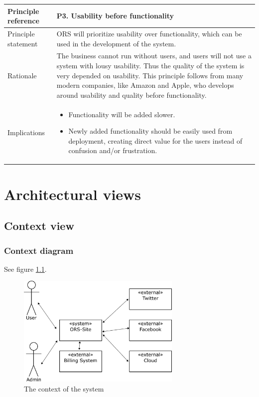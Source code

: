 \documentclass[a4paper,11pt]{report}
\begin{document}
\begin{center}
  \begin{tabular}[h!]{| >{\columncolor{gray}}p{} | p{} |}
    \hline
    Principle reference & P3. Usability before functionality\\
    \hline
    Principle statement & ORS will prioritize usability over functionality, which can be used in the development of the system.\\
    \hline
    Rationale & The business cannot run without users, and users will not use a system with lousy usability. Thus the quality of the system is very depended on usability. This principle follows from many modern companies, like Amazon and Apple, who develops around usability and quality before functionality. \\
    \hline
    Implications &
      \begin{itemize}
        \item Functionality will be added slower.
        \item Newly added functionality should be easily used from deployment, creating direct value for the users instead of confusion and/or frustration.
      \end{itemize}\\
    \hline
  \end{tabular}
\end{center}


\chapter{Architectural views}
\label{cha:architectural-views}
\thispagestyle{fancy}

\section{Context view}
\label{sec:context-view}



\subsection{Context diagram}
\label{sec:context-diagram}

See figure \ref{fig:context}.

\begin{figure}[h!]
  \centering
  \includegraphics[width=0.7\textwidth]{figures/context_drawing}
  \caption{The context of the system}
  \label{fig:context}
\end{figure}
\end{document}
